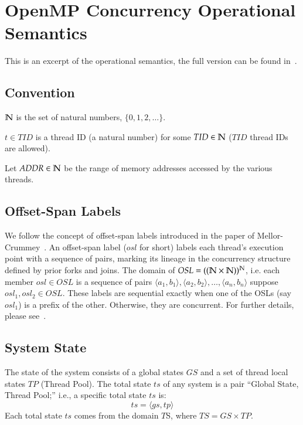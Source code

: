 \section{OpenMP Concurrency Operational Semantics}
\label{sec:appendixa}

This is an excerpt of the operational semantics, the full version can be found
in~\cite{atzeni_opsem16}. \vspace{-2ex}

\subsection{Convention}
\label{subsec:convention}

\begin{compactitem}
\item $\mathbb{N}$ is the set of natural numbers, $\{0,1,2,\ldots\}$.
\item $t\in TID$ is a thread ID (a natural number) for some $TID\in \mathbb{N}$ ($TID$
  thread IDs are allowed).
\item Let $ADDR\in\mathbb{N}$ be the range of memory addresses accessed by the various
  threads.
\end{compactitem}

\subsection{Offset-Span Labels}
\label{subsec:osl}

We follow the concept of offset-span labels introduced in the paper of
Mellor-Crummey~\cite{Mellor-Crummey:1991:ODD:125826.125861}.
%
An offset-span label ($osl$ for short) labels each thread's execution point
with a sequence of pairs, marking its lineage in the concurrency structure
defined by prior forks and joins.
%
The domain of $OSL = ((\mathbb{N}\times\mathbb{N}))^{\mathbb{N}}$, i.e. each member $osl\in OSL$ is a
sequence of pairs
$\langle a_1,b_1\rangle, \langle a_2,b_2\rangle,\ldots,\langle a_n,b_n\rangle$
suppose $osl_1, osl_2\in OSL$.
%
These labels are sequential exactly when one of the OSLs (say $osl_1$) is a
prefix of the other.
%
Otherwise, they are concurrent.
%
For further details, please see~\cite{Mellor-Crummey:1991:ODD:125826.125861}.

\subsection{System State}
\label{subsec:systemstate}

The state of the system consists of a global states $GS$ and a set of thread
local states $TP$ (Thread Pool).
%
The total state $ts$ of any system is a pair ``Global State, Thread Pool;''
i.e., a specific total state $ts$ is:
\[ ts = \langle gs, tp \rangle \]
\noindent Each total state $ts$ comes from the domain $T$S, where
$TS = GS\times TP$.

